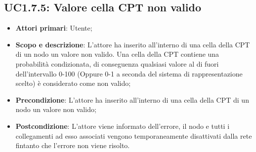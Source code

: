 \subsection{UC1.7.5: Valore cella CPT non valido} 
\begin{itemize} 
	\item{\textbf{Attori primari}: Utente;} 
	\item{\textbf{Scopo e descrizione}: L'attore ha inserito all'interno di una cella della CPT di un nodo un valore non valido. Una cella della CPT contiene una probabilità condizionata, di conseguenza qualsiasi valore al di fuori dell'intervallo 0-100 (Oppure 0-1 a seconda del sistema di rappresentazione scelto) è considerato come non valido;} 
	\item{\textbf{Precondizione}: L'attore ha inserito all'interno di una cella della CPT di un nodo un valore non valido;} 
	\item{\textbf{Postcondizione}: L'attore viene informato dell'errore, il nodo e tutti i collegamenti ad esso associati vengono temporaneamente disattivati dalla rete fintanto che l'errore non viene risolto.} 
\end{itemize} 
